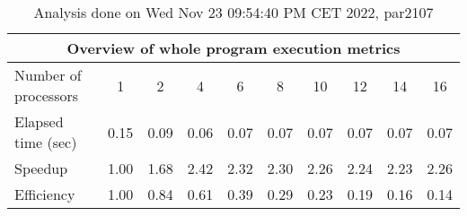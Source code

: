 \begin{table}[h]
\begin{center}
\begin{tabular}{|l|c|c|c|c|c|c|c|c|c|}
\hline
\multicolumn{10}{|c|}{Overview of whole program execution metrics} \\
\hline
\hline
Number of processors & 1 & 2 & 4 & 6 & 8 & 10 & 12 & 14 & 16 \\
\hline
Elapsed time (sec)      &       0.15 &       0.09 &       0.06 &       0.07 &       0.07 &       0.07 &       0.07 &       0.07 &       0.07 \\
\hline
Speedup                 &       1.00 &       1.68 &       2.42 &       2.32 &       2.30 &       2.26 &       2.24 &       2.23 &       2.26 \\
\hline
Efficiency              &       1.00 &       0.84 &       0.61 &       0.39 &       0.29 &       0.23 &       0.19 &       0.16 &       0.14 \\
\hline
\end{tabular}
\end{center}
\caption{ Analysis done on Wed Nov 23 09:54:40 PM CET 2022, par2107}
\end{table}
